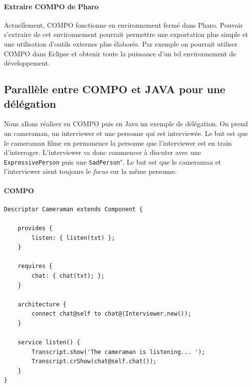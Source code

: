 \documentclass[11pt,a4paper,openany,oneside]{book}
\begin{document}
\subsubsection{Extraire COMPO de Pharo}
Actuellement, COMPO fonctionne en environnement fermé dans Pharo. Pouvoir s'extraire de cet environnement pourrait permettre une exportation plus simple et une utilisation d'outils externes plus élaborés. Par exemple on pourrait utiliser COMPO dans Eclipse et obtenir toute la puissance d'un tel environnement de développement.





\begin{appendices}
\appendixpage
\noappendicestocpagenum
\addappheadtotoc

\chapter{Parallèle entre COMPO et JAVA pour une délégation}


\label{Annexe A}

Nous allons réaliser en COMPO puis en Java un exemple de délégation. On prend un cameraman, un interviewer et une personne qui est interviewée. Le but est que le cameraman filme en permanence la personne que l'interviewer est en train d'interroger. L'interviewer va donc commencer à discuter avec une \texttt{ExpressivePerson} puis une \texttt{SadPerson}". Le but est que le cameraman et l'interviewer aient toujours le \textit{focus} sur la même personne.

\subsubsection{COMPO}
\begin{lstlisting}[language=Compo, frame=single, caption=Cameraman]
Descriptor Cameraman extends Component {

    provides {
        listen: { listen(txt) };
    }
    
    requires {
        chat: { chat(txt); };
    }
    
    architecture {
        connect chat@self to chat@(Interviewer.new());
    }
    
    service listen() {
        Transcript.show('The cameraman is listening... ');
        Transcript.crShow(chat@self.chat());
    }
}
\end{lstlisting}


\end{appendices}
\end{document}
